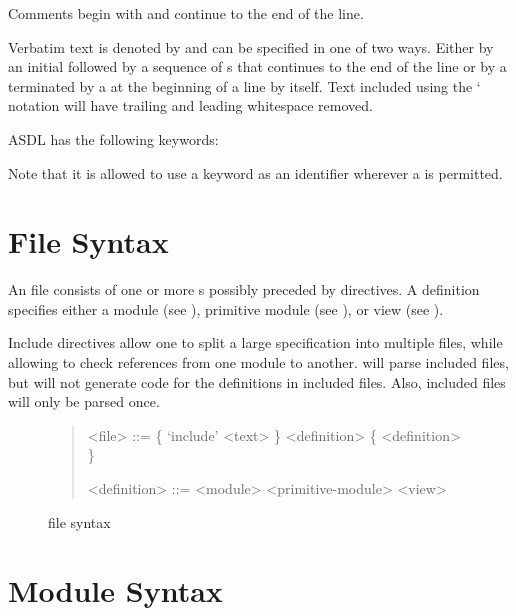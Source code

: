 Comments begin with \lit{--}
and continue to the end of the line.

Verbatim text is denoted by  and can be specified in one of two ways.
Either by an initial \lit{:} followed by a sequence of s that
continues to the end of the line or by a \lit{\%\%} terminated by a \lit{\%\%}
at the beginning of a line by itself.
Text included using the `\lit{:} notation will have trailing and leading
whitespace removed.

ASDL has the following keywords:
\begin{quote}
     
     
\end{quote}%
Note that it is allowed to use a keyword as an identifier wherever a  is permitted.

\section{File Syntax}

An \asdl{} file consists of one or more s possibly preceded by 
directives.
A definition specifies either a module (see ),
primitive module (see ),
or view (see ).

Include directives allow one to split a large \asdl{} specification into multiple files,
while allowing \asdlgen{} to check references from one module to another.
\asdlgen{} will parse included files, but will not generate code for the definitions in included
files.
Also, included files will only be parsed once.

\begin{figure}[t]
  \begin{quote}
    \begin{grammar}
      <file>  ::=  \{ `include' <text> \} <definition> \{ <definition> \}

      <definition> ::= <module>
        \alt{} <primitive-module>
        \alt{} <view>
    \end{grammar}
  \end{quote}
  \caption{\asdl{} file syntax}
  \label{fig:file-syntax}
\end{figure}%

\section{Module Syntax}
\label{sec:module-syntax}

